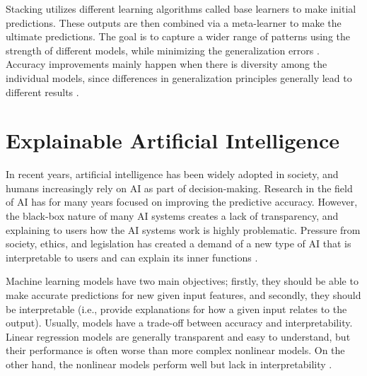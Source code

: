 Stacking utilizes different learning algorithms called base learners to make initial predictions. These outputs are then combined via a meta-learner to make the ultimate predictions. The goal is to capture a wider range of patterns using the strength of different models, while minimizing the generalization errors \cite{moon_advancing_2024,ribeiro_ensemble_2020,divina_stacking_2018}. Accuracy improvements mainly happen when there is diversity among the individual models, since differences in generalization principles generally lead to different results \cite{ribeiro_ensemble_2020}.

\section{Explainable Artificial Intelligence}

In recent years, artificial intelligence has been widely adopted in society, and humans increasingly rely on AI as part of decision-making. Research in the field of AI has for many years focused on improving the predictive accuracy. However, the black-box nature of many AI systems creates a lack of transparency, and explaining to users how the AI systems work is highly problematic. Pressure from society, ethics, and legislation has created a demand of a new type of AI that is interpretable to users and can explain its inner functions %
\cite{minh_explainable_2022,angelov_explainable_2021}.

Machine learning models have two main objectives; firstly, they should be able to make accurate predictions for new given input features, and secondly, they should be interpretable (i.e., provide explanations for how a given input relates to the output). Usually, models have a trade-off between accuracy and interpretability. Linear regression models are generally transparent and easy to understand, but their performance is often worse than more complex nonlinear models. On the other hand, the nonlinear models perform well but lack in interpretability \cite{saarela_comparison_2021}.

